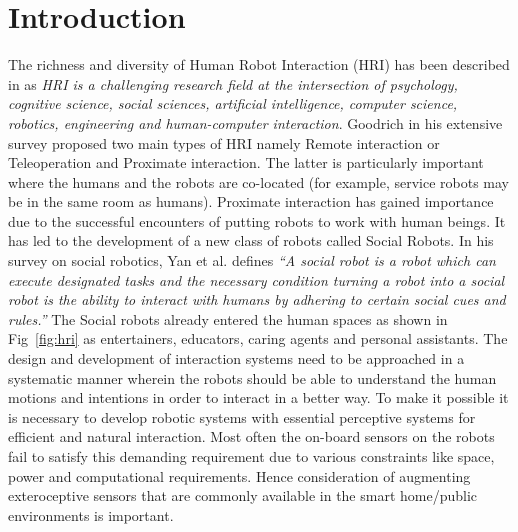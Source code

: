 \documentclass{llncs}
\begin{document}
\section{Introduction}
The richness and diversity of Human Robot Interaction (HRI) has been described in \cite{Dautenhahn2007} as \emph{HRI is a challenging research field at the intersection of psychology, cognitive science, social sciences, artificial intelligence, computer science, robotics, engineering and human-computer interaction}. Goodrich\cite{Goodrich:2007:HIS:1348099.1348100} in his extensive survey proposed two main types of HRI namely Remote interaction or Teleoperation and Proximate interaction. The latter is particularly important where the humans and the robots are co-located (for example, service robots may be in the same room as humans). Proximate interaction has gained importance due to the successful encounters of putting robots to work with human beings. It has led to the development of a new class of robots called Social Robots. In his survey on social robotics, Yan et al. \cite{Yan2014} defines \emph{“A social robot is a robot which can execute designated tasks and the necessary condition turning a robot into a social robot is the ability to interact with humans by adhering to certain social cues and rules.”}
The Social robots already entered the human spaces as shown in Fig~\ref{fig:hri} as entertainers\cite{NaoTheRobot}, educators\cite{NaoTheRobot}, caring agents\cite{ASKNao} and personal assistants\cite{ProjectRomeo}\cite{PepperTheRobot}. The design and development of interaction systems need to be approached in a systematic manner wherein the robots should be able to understand the human motions and intentions in order to interact in a better way. To make it possible it is necessary to develop robotic systems with essential perceptive systems for efficient and natural interaction. Most often the on-board sensors on the robots fail to satisfy this demanding requirement due to various constraints like space, power and computational requirements. Hence consideration of augmenting exteroceptive sensors that are commonly available in the smart home/public environments is important.
\end{document}
